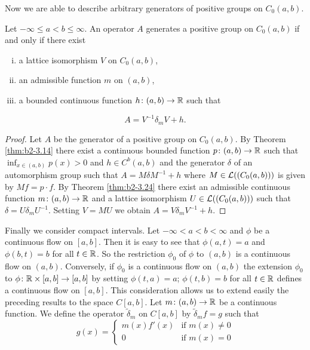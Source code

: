 Now we are able to describe arbitrary generators of positive groups on $C_{0}(a,b)$.
\begin{theorem}\label{thm:b2-3.25}
Let $-\infty \leq a < b \leq \infty$.
An operator $A$ generates a positive group on $C_{0}(a,b)$ if and only if there exist
\begin{enumerate}[i)]
\item 
a lattice isomorphism $V$ on $C_{0}(a,b)$,
\item 
an admissible function $m$ on $(a,b)$,
\item 
a bounded continuous function $h \colon (a,b) \to \mathbb{R}$ such that
\end{enumerate}
\begin{equation}\label{eq:b2-3.24}
A = V^{-1}\delta_{m}V + h.
\end{equation}
\end{theorem}
\begin{proof}
Let $A$ be the generator of a positive group on $C_{0}(a,b)$.
By Theorem \ref{thm:b2-3.14} there exist a continuous bounded function $p \colon (a,b) \to \mathbb{R}$ such that $\inf_{x \in (a,b)} p(x) > 0$ and $h \in C^{b}(a,b)$ and the generator $\delta$ of an automorphism group such that $A = M\delta M^{-1} + h$ where $M \in \mathcal{L}((C_{0}(a,b)))$ is given by $Mf = p \cdot f$.
By Theorem \ref{thm:b2-3.24} there exist an admissible continuous function $m \colon (a,b) \to \mathbb{R}$ and a lattice isomorphism $U \in \mathcal{L}((C_{0}(a,b)))$ such that $\delta = U\delta_{m}U^{-1}$.
Setting $V = MU$ we obtain $A = V\delta_{m}V^{-1} + h$.
\end{proof}
Finally we consider compact intervals.
Let $-\infty < a < b < \infty$ and $\phi$ be a continuous flow on $[a,b]$.
Then it is easy to see that $\phi(a,t) = a$ and $\phi(b,t) = b$ for all $t \in \mathbb{R}$.
So the restriction $\phi_{0}$ of $\phi$ to $(a,b)$ is a continuous flow on $(a,b)$.
Conversely, if $\phi_{0}$ is a continuous flow on $(a,b)$ the extension $\phi_{0}$ to $\phi \colon \mathbb{R} \times [a,b] \to [a,b]$ by setting $\phi(t,a) = a$; $\phi(t,b) = b$ for all $t \in \mathbb{R}$ defines a continuous flow on $[a,b]$.
This consideration allows us to extend easily the preceding results to the space $C[a,b]$.
Let $m \colon (a,b) \to \mathbb{R}$ be a continuous function.
We define the operator $\tilde{\delta}_{m}$ on $C[a,b]$ by $\widetilde{\delta}_{m}f = g$ such that
\begin{equation}\label{eq:b2-3.25}
g(x) = \begin{cases}
    m(x)f'(x) & \text{if } m(x) \neq 0 \\
    0 & \text{if } m(x) = 0
\end{cases}
\end{equation}
